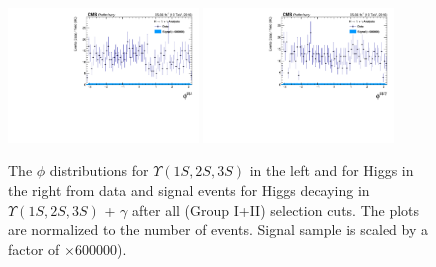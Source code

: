\begin{figure}[!htbp]
\begin{center}
\includegraphics[width=0.45\textwidth]{figures_and_tables/outputPlots/HtoUpsilon_Cat0_ZZZZZ/nEvts/data_x_mc/withKinCuts/h_withKin_Upsilon_phi}\hspace*{1.cm}
\includegraphics[width=0.45\textwidth]{figures_and_tables/outputPlots/HtoUpsilon_Cat0_ZZZZZ/nEvts/data_x_mc/withKinCuts/h_withKin_Z_phi}
\end{center}\vspace*{-.5cm}
\caption{The $\phi$ distributions for $\Upsilon(1S,2S,3S)$ in the left and for Higgs in the right from data and signal events for Higgs decaying in $\Upsilon(1S,2S,3S)$ + $\gamma$ after all (Group I+II) selection cuts. The plots are normalized to the number of events. Signal sample is scaled by a factor of $\times 600000$).}
\label{fig:phiUpsilon_and_Higgs_HtoUpsilon_Cat0_groupI_plus_II}
\end{figure}


